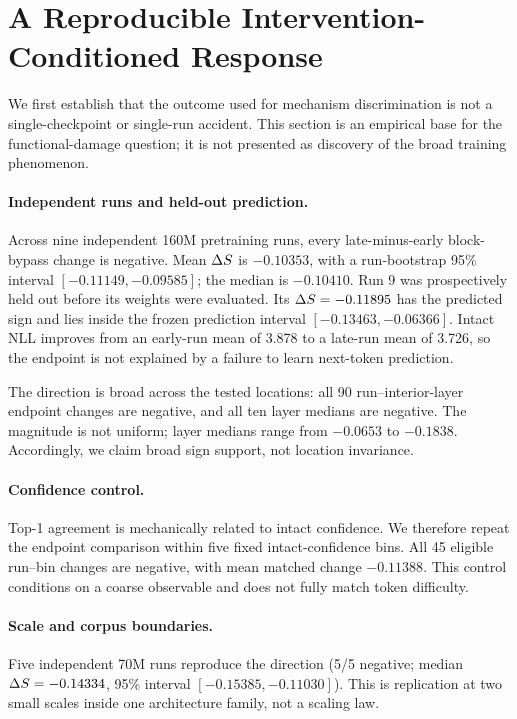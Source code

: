 \section{A Reproducible Intervention-Conditioned Response}
\label{sec:repro}

We first establish that the outcome used for mechanism discrimination is not a
single-checkpoint or single-run accident. This section is an empirical base for
the functional-damage question; it is not presented as discovery of the broad
training phenomenon.



\paragraph{Independent runs and held-out prediction.}
Across nine independent 160M pretraining runs, every late-minus-early
block-bypass change is negative. Mean $\Delta S$ is $-0.10353$, with a
run-bootstrap 95\% interval $[-0.11149,-0.09585]$; the median is $-0.10410$.
Run 9 was prospectively held out before its weights were evaluated. Its
$\Delta S=-0.11895$ has the predicted sign and lies inside the frozen prediction
interval $[-0.13463,-0.06366]$. Intact NLL improves from an early-run mean of
3.878 to a late-run mean of 3.726, so the endpoint is not explained by a failure
to learn next-token prediction.

The direction is broad across the tested locations: all 90 run--interior-layer
endpoint changes are negative, and all ten layer medians are negative. The
magnitude is not uniform; layer medians range from $-0.0653$ to $-0.1838$.
Accordingly, we claim broad sign support, not location invariance.

\paragraph{Confidence control.}
Top-1 agreement is mechanically related to intact confidence. We therefore
repeat the endpoint comparison within five fixed intact-confidence bins. All
45 eligible run--bin changes are negative, with mean matched change $-0.11388$.
This control conditions on a coarse observable and does not fully match token
difficulty.

\paragraph{Scale and corpus boundaries.}
Five independent 70M runs reproduce the direction (5/5 negative; median
$\Delta S=-0.14334$, 95\% interval $[-0.15385,-0.11030]$). This is replication at
two small scales inside one architecture family, not a scaling law.

